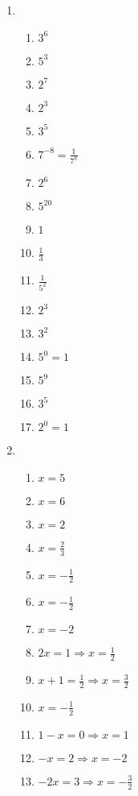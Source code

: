 \documentclass[a4paper]{article}
\begin{document}
\begin{enumerate}
\item %

  \begin{enumerate}
  \item $3^6$ %
  \item $5^3$ %
  \item $2^7$ %
  \item $2^3$ %
  \item $3^5$ %
  \item $7^{-8} = \frac{1}{7^8}$ %
  \item $2^6$ %
  \item $5^{20}$ %
  \item $1$ %
  \item $\frac{1}{3}$ %
  \item $\frac{1}{5^2}$ %
  \item $2^3$ %
  \item $3^2$ %
  \item $5^0=1$ %
  \item $5^9$ %
  \item $3^5$ %
  \item $2^0=1$ %
  \end{enumerate}

\item %
  \begin{enumerate}
  \item $x=5$ %
  \item $x=6$ %
  \item $x=2$ %
  \item $x=\frac{2}{3}$ %
  \item $x=-\frac{1}{2}$ %
  \item $x=-\frac{1}{2}$ %
  \item $x=-2$ %
  \item $2x=1 \Rightarrow x=\frac{1}{2}$ %
  \item $x+1=\frac{1}{2} \Rightarrow x=\frac{3}{2}$ %
  \item $x=-\frac{1}{2}$ %
  \item $1-x=0 \Rightarrow x=1$ %
  \item $-x = 2 \Rightarrow x=-2$ %
  \item $-2x = 3 \Rightarrow x=-\frac{3}{2}$ %
  \end{enumerate}


\end{enumerate}
\end{document}
